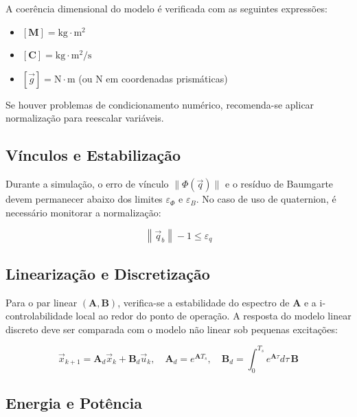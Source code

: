 A coerência dimensional do modelo é verificada com as seguintes expressões:

\begin{itemize}
\item $ [\mathbf{M}] = \mathrm{kg} \cdot \mathrm{m}^2 $
\item $ [\mathbf{C}] = \mathrm{kg} \cdot \mathrm{m}^2 / \mathrm{s} $
\item $ [\vec{g}] = \mathrm{N} \cdot \mathrm{m} $ (ou $ \mathrm{N} $ em coordenadas prismáticas)
\end{itemize}

Se houver problemas de condicionamento numérico, recomenda-se aplicar normalização para reescalar variáveis.

\subsection{Vínculos e Estabilização}

Durante a simulação, o erro de vínculo $ \| \Phi(\vec{q}) \| $ e o resíduo de Baumgarte devem permanecer abaixo dos limites $ \varepsilon_\Phi $ e $ \varepsilon_B $. No caso de uso de quaternion, é necessário monitorar a normalização:

\begin{equation}
\left\| \vec{q}_b \right\| - 1 \leq \varepsilon_q
\label{eq:erro_quaternion}
\end{equation}

\subsection{Linearização e Discretização}

Para o par linear $ (\mathbf{A}, \mathbf{B}) $, verifica-se a estabilidade do espectro de $ \mathbf{A} $ e a i-controlabilidade local ao redor do ponto de operação.
A resposta do modelo linear discreto deve ser comparada com o modelo não linear sob pequenas excitações:

\begin{equation}
\vec{x}_{k+1} = \mathbf{A}_d \vec{x}_k + \mathbf{B}_d \vec{u}_k, \quad
\mathbf{A}_d = e^{\mathbf{A}T_s}, \quad
\mathbf{B}_d = \int_0^{T_s} e^{\mathbf{A}\tau} d\tau \, \mathbf{B}
\label{eq:discretizacao_ZOH}
\end{equation}

\subsection{Energia e Potência}

